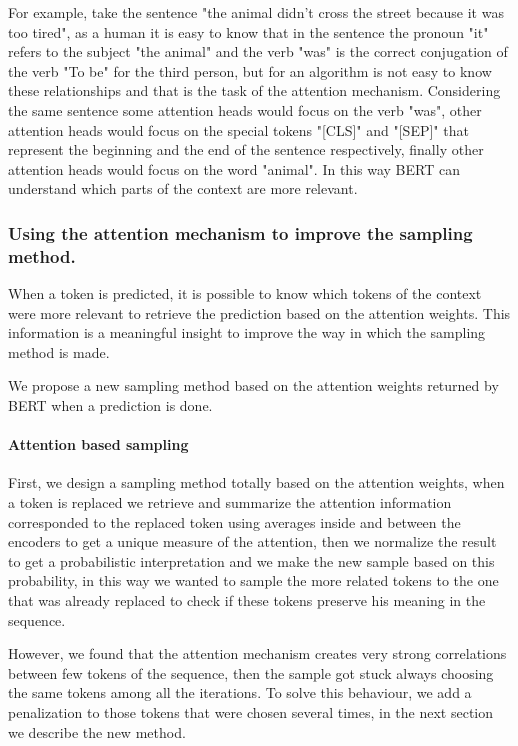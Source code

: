 \documentclass[10pt,twocolumn,letterpaper]{article}
\begin{document}
For example, take the sentence "the animal didn't cross the street because it was too tired",
as a human it is easy to know that in the sentence the pronoun "it" refers to the subject "the animal"
and the verb "was" is the correct conjugation of the verb "To be" for the third person, but for an
algorithm is not easy to know these relationships and that is the task of the attention mechanism.
Considering the same sentence
some attention heads would focus on the verb "was", other attention heads would focus
on the special tokens "[CLS]" and "[SEP]" that represent the beginning and the end of the sentence
respectively, finally other attention heads would focus on the word "animal". In this way BERT can
understand which parts of the context are more relevant.

\subsubsection{Using the attention mechanism to improve the sampling method.}
When a token is predicted, it is possible to know which tokens of the context were more relevant to
retrieve the prediction based on the attention weights.
This information is a meaningful insight to improve
the way in which the sampling method is made.

We propose a new sampling method based on the attention
weights returned by BERT when a prediction is done.

\paragraph{Attention based sampling}
First, we design a sampling method totally based on the attention weights, when a token is replaced we retrieve
and summarize the attention information corresponded to the replaced token using averages inside and between the
encoders to get a unique measure of the attention, then we normalize the result to get a probabilistic interpretation
and we make the new sample based on this probability, in this way we wanted to sample the more related tokens to the one
that was already replaced to check if these tokens preserve his meaning in the sequence.

However, we found that the attention mechanism creates very strong correlations between
few tokens of the sequence, then the sample got stuck always choosing the same tokens among
all the iterations.
To solve this behaviour, we add a penalization to those tokens that were
chosen several times, in the next section we describe the new method.
\end{document}
